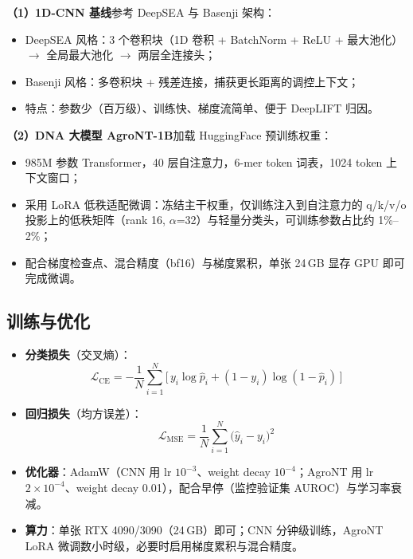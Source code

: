 \documentclass[UTF8,11pt,a4paper]{ctexart}
\begin{document}
\textbf{（1）1D-CNN 基线}\quad 参考 DeepSEA\cite{zhou2015} 与 Basenji\cite{avsec2021} 架构：
\begin{itemize}
\item DeepSEA 风格：3 个卷积块（1D 卷积 + BatchNorm + ReLU + 最大池化）$\rightarrow$ 全局最大池化 $\rightarrow$ 两层全连接头；
\item Basenji 风格：多卷积块 + 残差连接，捕获更长距离的调控上下文；
\item 特点：参数少（百万级）、训练快、梯度流简单、便于 DeepLIFT 归因。
\end{itemize}

\textbf{（2）DNA 大模型 AgroNT-1B}\quad 加载 HuggingFace 预训练权重\cite{mendoza2024}：
\begin{itemize}
\item 985M 参数 Transformer，40 层自注意力，6-mer token 词表，1024 token 上下文窗口；
\item 采用 LoRA 低秩适配微调：冻结主干权重，仅训练注入到自注意力的 q/k/v/o 投影上的低秩矩阵（rank 16, $\alpha$=32）与轻量分类头，可训练参数占比约 1\%--2\%；
\item 配合梯度检查点、混合精度（bf16）与梯度累积，单张 24\,GB 显存 GPU 即可完成微调。
\end{itemize}

\subsection{训练与优化}
\label{sec:method-train}

\begin{itemize}
\item \textbf{分类损失}（交叉熵）：
\begin{equation}
\mathcal{L}_{\mathrm{CE}} = -\frac{1}{N}\sum_{i=1}^{N}\bigl[\, y_i \log \hat{p}_i + (1-y_i)\log(1-\hat{p}_i)\,\bigr]
\end{equation}
\item \textbf{回归损失}（均方误差）：
\begin{equation}
\mathcal{L}_{\mathrm{MSE}} = \frac{1}{N}\sum_{i=1}^{N}\bigl(\hat{y}_i - y_i\bigr)^2
\end{equation}
\item \textbf{优化器}：AdamW（CNN 用 lr $10^{-3}$、weight decay $10^{-4}$；AgroNT 用 lr $2\times10^{-4}$、weight decay 0.01），配合早停（监控验证集 AUROC）与学习率衰减。
\item \textbf{算力}：单张 RTX 4090/3090（24\,GB）即可；CNN 分钟级训练，AgroNT LoRA 微调数小时级，必要时启用梯度累积与混合精度。
\end{itemize}
\end{document}
